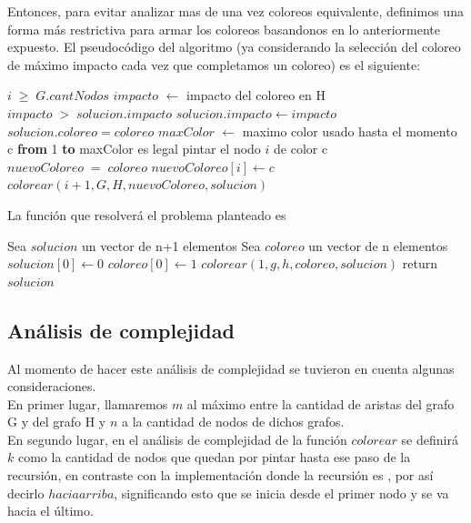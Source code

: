 Entonces, para evitar analizar mas de una vez coloreos equivalente, definimos una forma m\'as restrictiva para armar los coloreos basandonos en lo anteriormente expuesto.
El pseudoc\'odigo del algoritmo (ya considerando la selecci\'on del coloreo de m\'aximo impacto cada vez que completamos un coloreo) es el siguiente:

\begin{algorithm}[H]
\caption{} 
\begin{codebox}

\li \If $i \; \geq \; G.cantNodos$  \Do
\li	$impacto$ $\gets$ impacto del coloreo en H
\li		\If $impacto\; > \; solucion.impacto$ \Do
\li			$solucion.impacto \gets impacto$
\li			$solucion.coloreo = coloreo$
			\End
	\End
\li \Else \Do
\li		$maxColor$ $\gets$ maximo color usado hasta el momento 	
\li		\For c \textbf{from} 1 \textbf{to} maxColor \Do
\li			\If es legal pintar el nodo $i$ de color c \Do
\li					$nuevoColoreo \; = \; coloreo$
\li         $nuevoColoreo[i] \gets c$
\li         $colorear(i+1, G, H, nuevoColoreo, solucion)$
             \End
         \End
\End
\end{codebox}
\end{algorithm}


La funci\'on que resolver\'a el problema planteado es

\begin{algorithm}[H]
\caption{} 
\begin{codebox}
\li Sea $solucion$ un vector de n+1 elementos
\li Sea $coloreo$ un vector de n elementos
\li $solucion[0] \gets 0$
\li $coloreo[0] \gets 1$
\li $colorear(1,g,h,coloreo,solucion)$
\li	return $solucion$
\End
\end{codebox}
\end{algorithm}



\subsection{Análisis de complejidad}

\indent Al momento de hacer este análisis de complejidad se tuvieron en cuenta algunas consideraciones.\\
\indent En primer lugar, llamaremos $m$ al máximo entre la cantidad de aristas del grafo G y del grafo H  y $n$ a la cantidad de nodos de dichos grafos.\\
\indent En segundo lugar, en el análisis de complejidad de la función $colorear$ se definirá $k$ como la cantidad de nodos que quedan por pintar hasta ese paso de la recursión, en contraste con la implementación donde la recursión es , por así decirlo $hacia arriba$, significando esto que se inicia desde el primer nodo y se va hacia el último.\\

